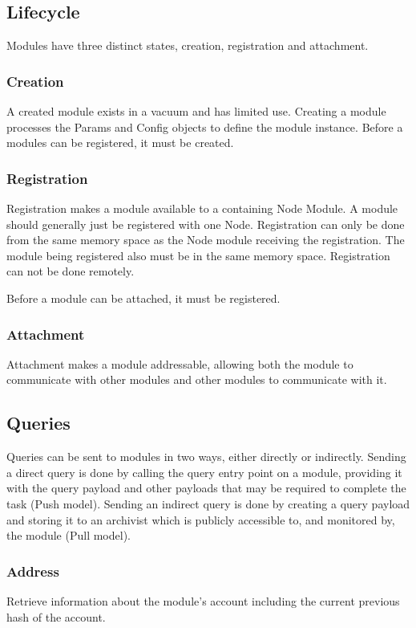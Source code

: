 \documentclass{article}
\begin{document}
\subsection{Lifecycle}
Modules have three distinct states, creation, registration and attachment.

\subsubsection{Creation}
A created module exists in a vacuum and has limited use.  Creating a module processes the Params and Config objects to define the module instance.  Before a modules can be registered, it must be created.

\subsubsection{Registration}
Registration makes a module available to a containing Node Module.  A module should generally just be registered with one Node.  Registration can only be done from the same memory space as the Node module receiving the registration.  The module being registered also must be in the same memory space.  Registration can not be done remotely.

Before a module can be attached, it must be registered.

\subsubsection{Attachment}
Attachment makes a module addressable, allowing both the module to communicate with other modules and other modules to communicate with it.

\subsection{Queries}
Queries can be sent to modules in two ways, either directly or indirectly.  Sending a direct query is done by calling the query entry point on a module, providing it with the query payload and other payloads that may be required to complete the task (Push model).  Sending an indirect query is done by creating a query payload and storing it to an archivist which is publicly accessible to, and monitored by, the module (Pull model).
\subsubsection{Address}
Retrieve information about the module's account including the current previous hash of the account.
\end{document}

